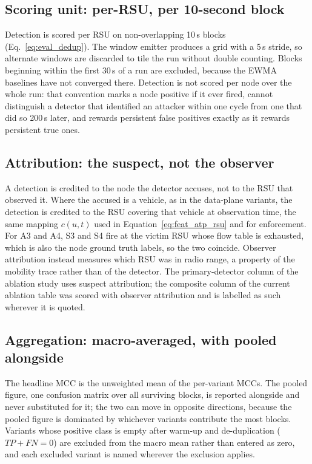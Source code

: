 \documentclass[12pt, a4paper]{report}
\begin{document}
{{\subsection{Scoring unit: per-\ac{RSU}, per 10-second block}
Detection is scored per \ac{RSU} on non-overlapping 10\,s blocks
(Eq.~\ref{eq:eval_dedup}). The window emitter produces a grid with a
5\,s stride, so alternate windows are discarded to tile the run
without double counting. Blocks beginning within the first 30\,s of a
run are excluded, because the EWMA baselines have not converged there.
Detection is not scored per node over the whole run: that convention
marks a node positive if it ever fired, cannot distinguish a detector
that identified an attacker within one cycle from one that did so
200\,s later, and rewards persistent false positives exactly as it
rewards persistent true ones.

\subsection{Attribution: the suspect, not the observer}
A detection is credited to the node the detector accuses, not to the
\ac{RSU} that observed it. Where the accused is a vehicle, as in the
data-plane variants, the detection is credited to the \ac{RSU}
covering that vehicle at observation time, the same mapping $c(u,t)$
used in Equation~\eqref{eq:feat_atp_rsu} and for enforcement. For A3
and A4, S3 and S4 fire at the victim \ac{RSU} whose flow table is
exhausted, which is also the node ground truth labels, so the two
coincide. Observer attribution instead measures which \ac{RSU} was in
radio range, a property of the mobility trace rather than of the
detector. The primary-detector column of the ablation study uses
suspect attribution; the composite column of the current ablation
table was scored with observer attribution and is labelled as such
wherever it is quoted.

\subsection{Aggregation: macro-averaged, with pooled alongside}
The headline MCC is the unweighted mean of the per-variant MCCs. The
pooled figure, one confusion matrix over all surviving blocks, is
reported alongside and never substituted for it; the two can move in
opposite directions, because the pooled figure is dominated by
whichever variants contribute the most blocks. Variants whose
positive class is empty after warm-up and de-duplication
($TP+FN=0$) are excluded from the macro mean rather than entered as
zero, and each excluded variant is named wherever the exclusion
applies.

}}
\end{document}
